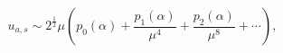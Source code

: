 \[u_{a,s}\sim 2^{\frac{1}{2}}\mu\left(p_{0}(\alpha)+\frac{p_{1}(\alpha)}{\mu^{4}%
}+\frac{p_{2}(\alpha)}{\mu^{8}}+\cdots\right),\]